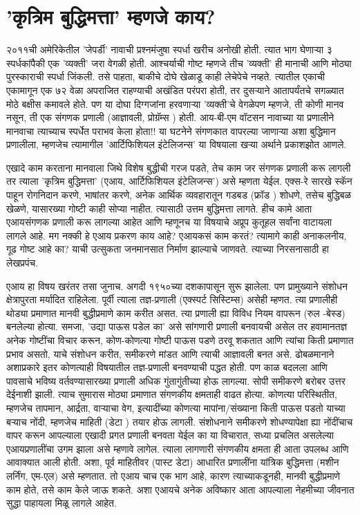 \chapter{'कृत्रिम बुद्धिमत्ता' म्हणजे काय?}

२०११ची अमेरिकेतील 'जेपर्डी' नावाची प्रश्नमंजुषा स्पर्धा खरीच अनोखी होती. त्यात भाग घेणाऱ्या ३ स्पर्धकांपैकी एक 'व्यक्ती' जरा वेगळी होती. आश्चर्याची गोष्ट म्हणजे तीच 'व्यक्ती' ही मानाची आणि मोठ्या पुरस्काराची स्पर्धा जिंकली. तसे पाहता, बाकीचे दोघे खेळाडू काही लेचेपेचे नव्हते. त्यातील एकाची एकामागून एक ७२ वेळा अपराजित राहण्याची अखंडित परंपरा होती, तर दुसऱ्याने आतापर्यंतचे सगळ्यात मोठे बक्षीस कमावले होते. पण या दोघा दिग्गजांना हरवणाऱ्या 'व्यक्ती'चे वेगळेपण म्हणजे, ती कोणी मानव नसून, ती एक संगणक प्रणाली (आज्ञावली, प्रोग्रॅम्स ) होती. आय-बी-एम वॉटसन   नावाच्या या प्रणालीने मानवाचा त्याच्याच स्पर्धेत पराभव केला होता!! या घटनेने संगणकात वापरल्या जाणाऱ्या अशा बुद्धिमान प्रणालीला, म्हणजेच त्यामागील 'आर्टिफिशियल इंटेलिजन्स' या विषयाला खऱ्या अर्थाने प्रकाशझोत आणले.

एखादे काम करताना मानवाला जिथे विशेष बुद्धीची गरज पडते, तेच काम जर संगणक प्रणाली करू लागली तर त्याला 'कृत्रिम बुद्धिमत्ता' (एआय, आर्टिफिशियल इंटेलिजन्स') असे म्हणता येईल. एक्स-रे सारखे स्कॅन पाहून रोगनिदान करणे, भाषांतर करणे, अनेक आर्थिक व्यवहारातून गडबड (फ्रॉड ) शोधणे, तसेच बुद्धिबळ खेळणे, यासारख्या गोष्टी काही सोप्या नाहीत. त्यासाठी उत्तम बुद्धिमत्ता लागते. हीच कामे आता एआयसंगणक प्रणाली करू लागल्या आहेत आणि म्हणूनच या विषयाचे अप्रूप कुतूहल सर्वांना वाटायला लागले आहे. मग नक्की हे एआय प्रकरण काय आहे? एआयकसं काम करतं? त्यामागे काही अनाकलनीय, गूढ गोष्ट आहे का? याची उत्सुकता जनमानसात निर्माण झाल्याचे जाणवते. त्याच्या निरसनासाठी हा लेखप्रपंच.

एआय हा विषय खरंतर तसा जुनाच. अगदी १९५०च्या दशकापासून सुरू झालेला. पण प्रामुख्याने संशोधन क्षेत्रापुरता मर्यादित राहिलेला. पूर्वी त्याला तज्ञ-प्रणाली (एक्स्पर्ट सिस्टिम्स) असेही म्हणत. त्या प्रणालीही थोड्या प्रमाणात मानवी बुद्धीप्रमाणे काम करीत असत. त्या प्रणाली ह्या विविध नियम वापरून (रुल -बेस्ड) बनलेल्या होत्या. समजा, 'उद्या पाऊस पडेल का' असे सांगणारी प्रणाली बनवायची असेल तर हवामानतज्ञ अनेक गोष्टींचा विचार करून, कोण-कोणत्या गोष्टी पाऊस पडणे ठरवू शकतात आणि त्यांचा किती प्रमाणात प्रभाव असतो, याचे संशोधन करीत, समीकरणे मांडत आणि त्याची आज्ञावली बनत असे. ढोबळमानाने अशाप्रकारे इतर कोणत्याही विषयातील तज्ञ-प्रणाली बनवण्याची पद्धत होती. पण काळ बदलला आणि पावसाचे भविष्य वर्तवण्यासारख्या प्रणाली अधिक गुंतागुंतीच्या होऊ लागल्या. सोपी समीकरणे बरोबर उत्तर देईनाशी झाली. त्याच सुमारास मोठ्या प्रमाणात संगणकीय क्षमताही वाढत होत्या. कोणत्या परिस्थितीत, म्हणजेच तापमान, आर्द्रता, वाऱ्याचा वेग, इत्यादींच्या कोणत्या मापांना/संख्याना किती पाऊस पडतो याच्या बऱ्याच नोंदी, म्हणजेच माहिती (डेटा ) तयार होऊ लागली. संशोधनाने समीकरणे शोधण्यापेक्षा ह्या नोंदींचाच वापर करून आपल्याला एखादी प्रगत प्रणाली बनवता येईल का या विचारात, सध्या प्रचलित असलेल्या एआयप्रणालींचा उगम झाला असे म्हणावे लागेल. त्याला लागणारी संगणकीय क्षमता ही आता उपलब्ध आणि आवाक्यात आली होती. अशा, पूर्व माहितीवर (पास्ट डेटा) आधारित प्रणालींना यांत्रिक बुद्धिमत्ता (मशीन लर्निंग, एम-एल) असे म्हणतात. तो एआय चाच एक भाग आहे, कारण त्याच्याकडूनही, मानवी बुद्धीप्रमाणे काम होते, तसे काम केले जाऊ शकते. अशा एआयचे अनेक अविष्कार आता आपल्याला नेहमीच्या जीवनात सुद्धा पाहायला मिळू लागले आहेत.

